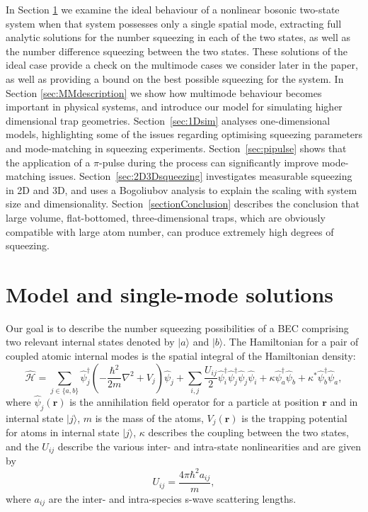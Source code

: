 \documentclass{iopart}
\begin{document}
In Section \ref{secTwoModeAnalytic} we examine the ideal behaviour of a nonlinear bosonic two-state system when that system possesses only a single spatial mode, extracting full analytic solutions for the number squeezing in each of the two states, as well as the number difference squeezing between the two states. These solutions of the ideal case provide a check on the multimode cases we consider later in the paper, as well as providing a bound on the best possible squeezing for the system.  In Section \ref{sec:MMdescription} we show how multimode behaviour becomes important in physical systems, and introduce our model for simulating higher dimensional trap geometries.  Section~\ref{sec:1Dsim} analyses one-dimensional models, highlighting some of the issues regarding optimising squeezing parameters and mode-matching in squeezing experiments.  Section~\ref{sec:pipulse} shows that the application of a $\pi$-pulse during the process can significantly improve mode-matching issues.  Section~\ref{sec:2D3Dsqueezing} investigates measurable squeezing in 2D and 3D, and uses a Bogoliubov analysis to explain the scaling with system size and dimensionality. Section~\ref{sectionConclusion} describes the conclusion that large volume, flat-bottomed, three-dimensional traps, which are obviously compatible with large atom number, can produce extremely high degrees of squeezing.


\section{Model and single-mode solutions}
\label{secTwoModeAnalytic}
Our goal is to describe the number squeezing possibilities of a BEC comprising two relevant internal states denoted by $|a\rangle$ and $|b\rangle$.  The Hamiltonian for a pair of coupled atomic internal modes is the spatial integral of the Hamiltonian density:
\begin{equation}
\hat{\mathcal{H}} = \sum_{j\in \{a,b\}} \hat{\psi}_j^{\dagger}\left(-\frac{\hbar^2}{2 m}\nabla^2+V_j\right)\hat{\psi}_j 
          + \sum_{i,j}\frac{U_{i j}}{2} \hat{\psi}_i^{\dagger} \hat{\psi}_j^{\dagger} \hat{\psi}_j \hat{\psi}_i
          + \kappa \hat{\psi}_a^{\dagger} \hat{\psi}_b + \kappa^* \hat{\psi}_b^{\dagger}  \hat{\psi}_a,
\label{eqFieldHamiltonian}
\end{equation}
where $\hat{\psi}_j(\mathbf{r})$ is the annihilation field operator for a particle at position $\mathbf{r}$ and in internal state $|j\rangle$, $m$ is the mass of the atoms, $V_j(\mathbf{r})$ is the trapping potential for atoms in internal state $|j\rangle$, $\kappa$ describes the coupling between the two states, and the $U_{ij}$ describe the various inter- and intra-state nonlinearities and are given by
\begin{equation}
U_{ij} = \frac{4 \pi \hbar^2 a_{ij}} {m},
\label{eqUij}
\end{equation}
where $a_{ij}$ are the inter- and intra-species s-wave scattering lengths.
\end{document}
